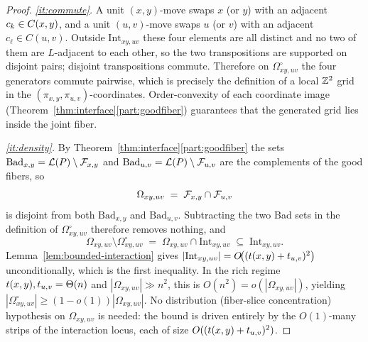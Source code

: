 \begin{proof}
\emph{\ref{it:commute}.}
A unit $(x,y)$-move swaps $x$ (or $y$) with an adjacent $c_k\in C(x,y)$,
and a unit $(u,v)$-move swaps $u$ (or $v$) with an adjacent
$c_\ell\in C(u,v)$. Outside $\mathrm{Int}_{xy,uv}$ these four elements
are all distinct and no two of them are $L$-adjacent to each other, so the
two transpositions are supported on disjoint pairs; disjoint transpositions
commute. Therefore on $\Omega^{\circ}_{xy,uv}$ the four generators commute
pairwise, which is precisely the definition of a local $\mathbb{Z}^2$ grid in the
$(\pi_{x,y},\pi_{u,v})$-coordinates. Order-convexity of each coordinate
image (Theorem~\ref{thm:interface}\ref{part:goodfiber}) guarantees that
the generated grid lies inside the joint fiber.

\emph{\ref{it:density}.}
By Theorem~\ref{thm:interface}\ref{part:goodfiber} the sets
$\mathrm{Bad}_{x,y}=\mathcal{L}(P)\setminus\mathcal{F}_{x,y}$ and $\mathrm{Bad}_{u,v}=\mathcal{L}(P)\setminus\mathcal{F}_{u,v}$
are the complements of the good fibers, so
\[
\Omega_{xy,uv}\;=\;\mathcal{F}_{x,y}\cap\mathcal{F}_{u,v}
\]
is disjoint from both $\mathrm{Bad}_{x,y}$ and $\mathrm{Bad}_{u,v}$.
Subtracting the two Bad sets in the definition of $\Omega^{\circ}_{xy,uv}$
therefore removes nothing, and
\[
\Omega_{xy,uv}\setminus\Omega^{\circ}_{xy,uv}
\;=\;\Omega_{xy,uv}\cap\mathrm{Int}_{xy,uv}
\;\subseteq\;\mathrm{Int}_{xy,uv}.
\]
Lemma~\ref{lem:bounded-interaction} gives
$|\mathrm{Int}_{xy,uv}|=O\!\bigl((t(x,y)+t_{u,v})^{2}\bigr)$ unconditionally,
which is the first inequality.  In the rich regime $t(x,y),t_{u,v}=\Theta(n)$
and $|\Omega_{xy,uv}|\gg n^{2}$, this is $O(n^{2})=o(|\Omega_{xy,uv}|)$,
yielding $|\Omega^{\circ}_{xy,uv}|\ge(1-o(1))|\Omega_{xy,uv}|$.
No distribution (fiber-slice concentration) hypothesis on $\Omega_{xy,uv}$
is needed: the bound is driven entirely by the $O(1)$-many strips of the
interaction locus, each of size $O((t(x,y)+t_{u,v})^{2})$.
\end{proof}

